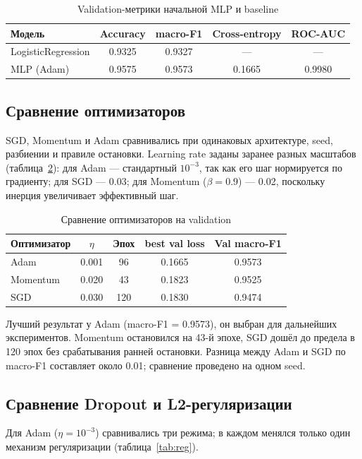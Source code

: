 \documentclass[oneside,a4paper,14pt]{extarticle}
\begin{document}
\begin{table}[ht]
\centering
\small
\begin{tabular}{lcccc}
\toprule
Модель & Accuracy & macro-F1 & Cross-entropy & ROC-AUC \\
\midrule
LogisticRegression & 0.9325 & 0.9327 & --- & --- \\
MLP (Adam) & 0.9575 & 0.9573 & 0.1665 & 0.9980 \\
\bottomrule
\end{tabular}
\caption{Validation-метрики начальной MLP и baseline}
\label{tab:mlpval}
\end{table}

\subsection{Сравнение оптимизаторов}
SGD, Momentum и Adam сравнивались при одинаковых архитектуре, seed, разбиении и правиле остановки. Learning rate заданы заранее разных масштабов (таблица~\ref{tab:opt}): для Adam --- стандартный $10^{-3}$, так как его шаг нормируется по градиенту; для SGD --- 0.03; для Momentum ($\beta=0.9$) --- 0.02, поскольку инерция увеличивает эффективный шаг.

\begin{table}[ht]
\centering
\begin{tabular}{lcccc}
\toprule
Оптимизатор & $\eta$ & Эпох & best val loss & Val macro-F1 \\
\midrule
Adam & 0.001 & 96 & 0.1665 & 0.9573 \\
Momentum & 0.020 & 43 & 0.1823 & 0.9525 \\
SGD & 0.030 & 120 & 0.1830 & 0.9474 \\
\bottomrule
\end{tabular}
\caption{Сравнение оптимизаторов на validation}
\label{tab:opt}
\end{table}

Лучший результат у Adam (macro-F1 = 0.9573), он выбран для дальнейших экспериментов. Momentum остановился на 43-й эпохе, SGD дошёл до предела в 120 эпох без срабатывания ранней остановки. Разница между Adam и SGD по macro-F1 составляет около 0.01; сравнение проведено на одном seed.

\subsection{Сравнение Dropout и L2-регуляризации}
Для Adam ($\eta=10^{-3}$) сравнивались три режима; в каждом менялся только один механизм регуляризации (таблица~\ref{tab:reg}).
\end{document}

